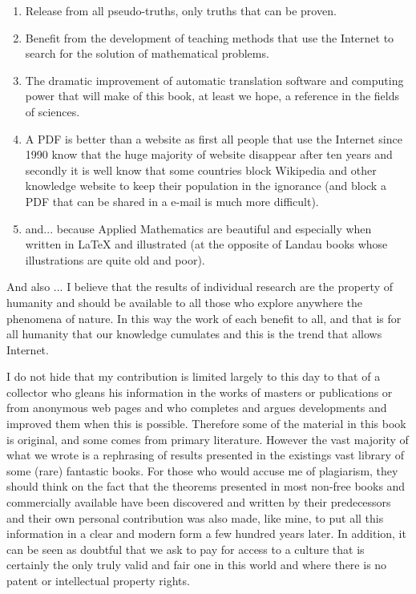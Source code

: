 \begin{enumerate}
		\item Release from all pseudo-truths, only truths that can be proven.

		\item Benefit from the development of teaching methods that use the Internet to search for the solution of mathematical problems.

		\item The dramatic improvement of automatic translation software and computing power that will make of this book, at least we hope, a reference in the fields of sciences.
		
		\item A PDF is better than a website as first all people that use the Internet since 1990 know that the huge majority of website disappear after ten years and secondly it is well know that some countries block Wikipedia and other knowledge website to keep their population in the ignorance (and block a PDF that can be shared in a e-mail is much more difficult).
		
		\item and... because Applied Mathematics are beautiful and especially when written in \LaTeX{} and illustrated (at the opposite of Landau books whose illustrations are quite old and poor).
\end{enumerate}

	And also ... I believe that the results of individual research are the property of humanity and should be available to all those who explore anywhere the phenomena of nature. In this way the work of each benefit to all, and that is for all humanity that our knowledge cumulates and this is the trend that allows Internet.

	I do not hide that my contribution is limited largely to this day to that of a collector who gleans his information in the works of masters or publications or from anonymous web pages and who completes and argues developments and improved them when this is possible. Therefore some of the material in this book is original, and some comes from primary literature. However the vast majority of what we wrote is a rephrasing of results presented in the existings vast library of some (rare) fantastic books. For those who would accuse me of plagiarism, they should think on the fact that the theorems presented in most non-free books and commercially available have been discovered and written by their predecessors and their own personal contribution was also made, like mine, to put all this information in a clear and modern form a few hundred years later. In addition, it can be seen as doubtful that we ask to pay for access to a culture that is certainly the only truly valid and fair one in this world and where there is no patent or intellectual property rights.

